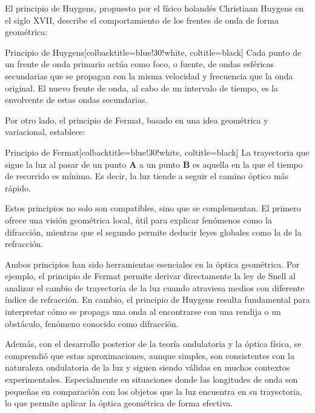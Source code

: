 El principio de Huygens, propuesto por el físico holandés Christiaan Huygens en el siglo XVII, describe el comportamiento de los frentes de onda de forma geométrica:

\begin{mybox}[green]{Principio de Huygens}[colbacktitle=blue!30!white, coltitle=black]
	Cada punto de un frente de onda primario actúa como foco, o fuente, de ondas esféricas secundarias que se propagan con la misma velocidad y frecuencia que la onda original. El nuevo frente de onda, al cabo de un intervalo de tiempo, es la envolvente de estas ondas secundarias.
\end{mybox}

Por otro lado, el principio de Fermat, basado en una idea geométrica y variacional, establece:

\begin{mybox}[green]{Principio de Fermat}[colbacktitle=blue!30!white, coltitle=black]
	La trayectoria que sigue la luz al pasar de un punto \textbf{A} a un punto \textbf{B} es aquella en la que el tiempo de recorrido es mínimo. Es decir, la luz tiende a seguir el camino óptico más rápido.
\end{mybox}

\vspace{0.3cm}

Estos principios no solo son compatibles, sino que se complementan. El primero ofrece una visión geométrica local, útil para explicar fenómenos como la difracción, mientras que el segundo permite deducir leyes globales como la de la refracción.

Ambos principios han sido herramientas esenciales en la óptica geométrica. Por ejemplo, el principio de Fermat permite derivar directamente la ley de Snell al analizar el cambio de trayectoria de la luz cuando atraviesa medios con diferente índice de refracción. En cambio, el principio de Huygens resulta fundamental para interpretar cómo se propaga una onda al encontrarse con una rendija o un obstáculo, fenómeno conocido como difracción.

Además, con el desarrollo posterior de la teoría ondulatoria y la óptica física, se comprendió que estas aproximaciones, aunque simples, son consistentes con la naturaleza ondulatoria de la luz y siguen siendo válidas en muchos contextos experimentales. Especialmente en situaciones donde las longitudes de onda son pequeñas en comparación con los objetos que la luz encuentra en su trayectoria, lo que permite aplicar la óptica geométrica de forma efectiva.

